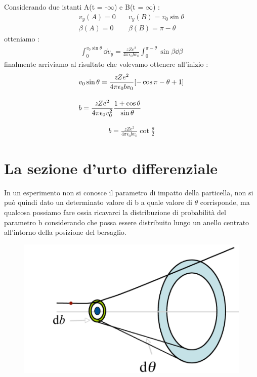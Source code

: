 Considerando due istanti A(t = -$\infty$) e B(t = $\infty$) : 
\begin{align*}
    v_{y}(A) = 0  & \quad  v_{y}(B) = v_{0}\sin{\theta} \\
    \beta(A) = 0  & \quad  \beta(B) = \pi - \theta 
\end{align*}
otteniamo : 
\begin{align*}
        \int_{0}^{v_{0}\sin{\theta}}\dd{v_{y}} = \frac{\textit{z}Ze^2}{4\pi\epsilon_{0}bv_{0}}\int_{0}^{\pi - \theta}\sin{\beta}\dd{\beta}
\end{align*}
finalmente arriviamo al risultato che volevamo ottenere all'inizio : 
\begin{align*}
        &v_{0}\sin{\theta} = \frac{\textit{z}Ze^2}{4\pi\epsilon_{0}bv_{0}}\qty[-\cos{\pi - \theta} + 1] \\[1em]
        &b = \frac{\textit{z}Ze^2}{4\pi\epsilon_{0}v_{0}^2}\frac{1 + \cos{\theta}}{\sin{\theta}} 
\end{align*}
\newpage
\begin{tcolorbox}[colback=red!5!white,colframe=red!50!black,title=ATTENZIONE !]
\begin{align*}
        b = \frac{\textit{z}Ze^2}{4\pi\epsilon_{0}bv_{0}}\cot{\frac{\theta}{2}}
\end{align*}
\end{tcolorbox}
\section{La sezione d'urto differenziale}
In un esperimento non si conosce il parametro di impatto della particella, non si può quindi
dato un determinato valore di b a quale valore di $\theta$ corrisponde, ma qualcosa possiamo fare ossia 
ricavarci la distribuzione di probabilità del parametro b considerando che possa essere distribuito 
lungo un anello centrato all'intorno della posizione del bersaglio.
\begin{figure}[!h]
    \centering
    \includegraphics[scale=0.8]{ch5Ratherford/distribuzioneB}
\end{figure}

